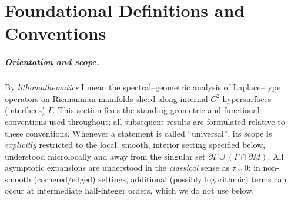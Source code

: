 


\providecommand{\vol}{\operatorname{vol}}
\providecommand{\Dom}{\operatorname{Dom}}
\providecommand{\Spec}{\operatorname{Spec}}
\providecommand{\Tr}{\operatorname{Tr}}

\chapter*{Foundational Definitions and Conventions}\label{sec:definitions}

\paragraph{Orientation and scope.}
By \emph{lithomathematics} I mean the spectral–geometric analysis of Laplace–type operators on Riemannian manifolds sliced along internal $C^2$ hypersurfaces (interfaces) $\Gamma$.
This section fixes the standing geometric and functional conventions used throughout; all subsequent results are formulated relative to these conventions.
Whenever a statement is called “universal”, its scope is \emph{explicitly} restricted to the local, smooth, interior setting specified below, understood microlocally and away from the singular set $\partial\Gamma\cup(\Gamma\cap\partial M)$.
All asymptotic expansions are understood in the \emph{classical} sense as $\tau\downarrow 0$; in non-smooth (cornered/edged) settings, additional (possibly logarithmic) terms can occur at intermediate half-integer orders, which we do not use below.

